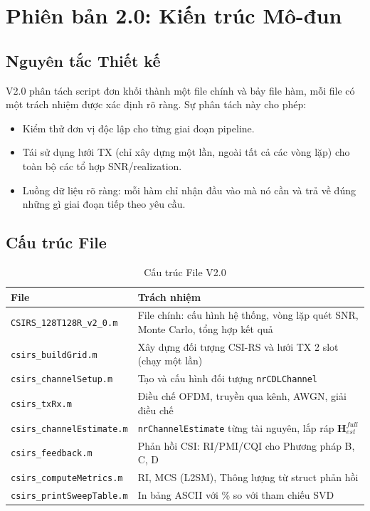 \documentclass[11pt,a4paper]{article}
\begin{document}
\section{Phiên bản 2.0: Kiến trúc Mô-đun}

\subsection{Nguyên tắc Thiết kế}

V2.0 phân tách script đơn khối thành một file chính và bảy file hàm,
mỗi file có một trách nhiệm được xác định rõ ràng. Sự phân tách này cho phép:

\begin{itemize}[noitemsep]
    \item Kiểm thử đơn vị độc lập cho từng giai đoạn pipeline.
    \item Tái sử dụng lưới TX (chỉ xây dựng một lần, ngoài tất cả các vòng lặp)
          cho toàn bộ các tổ hợp SNR/realization.
    \item Luồng dữ liệu rõ ràng: mỗi hàm chỉ nhận đầu vào mà nó cần và trả về
          đúng những gì giai đoạn tiếp theo yêu cầu.
\end{itemize}

\subsection{Cấu trúc File}

\begin{table}[h!]
\centering
\caption{Cấu trúc File V2.0}
\label{tab:files}
\begin{tabular}{lp{9cm}}
\toprule
\textbf{File} & \textbf{Trách nhiệm} \\
\midrule
\texttt{CSIRS\_128T128R\_v2\_0.m}    & File chính: cấu hình hệ thống, vòng lặp quét SNR, Monte Carlo, tổng hợp kết quả \\
\texttt{csirs\_buildGrid.m}          & Xây dựng đối tượng CSI-RS và lưới TX 2 slot (chạy một lần) \\
\texttt{csirs\_channelSetup.m}       & Tạo và cấu hình đối tượng \texttt{nrCDLChannel} \\
\texttt{csirs\_txRx.m}               & Điều chế OFDM, truyền qua kênh, AWGN, giải điều chế \\
\texttt{csirs\_channelEstimate.m}    & \texttt{nrChannelEstimate} từng tài nguyên, lắp ráp $\mathbf{H}_{est}^{full}$ \\
\texttt{csirs\_feedback.m}           & Phản hồi CSI: RI/PMI/CQI cho Phương pháp B, C, D \\
\texttt{csirs\_computeMetrics.m}     & RI, MCS (L2SM), Thông lượng từ struct phản hồi \\
\texttt{csirs\_printSweepTable.m}    & In bảng ASCII với \% so với tham chiếu SVD \\
\bottomrule
\end{tabular}
\end{table}
\end{document}
